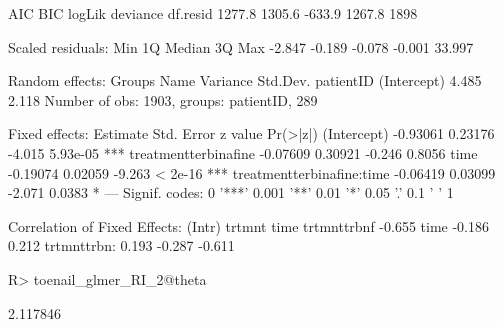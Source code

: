 \documentclass[article,nojss,shortnames]{jss}\usepackage[]{graphicx}\usepackage[]{xcolor}
\begin{document}
\begin{Schunk}
\begin{Soutput}
     AIC      BIC   logLik deviance df.resid 
  1277.8   1305.6   -633.9   1267.8     1898 

Scaled residuals: 
   Min     1Q Median     3Q    Max 
-2.847 -0.189 -0.078 -0.001 33.997 

Random effects:
 Groups    Name        Variance Std.Dev.
 patientID (Intercept) 4.485    2.118   
Number of obs: 1903, groups:  patientID, 289

Fixed effects:
                          Estimate Std. Error z value Pr(>|z|)    
(Intercept)               -0.93061    0.23176  -4.015 5.93e-05 ***
treatmentterbinafine      -0.07609    0.30921  -0.246   0.8056    
time                      -0.19074    0.02059  -9.263  < 2e-16 ***
treatmentterbinafine:time -0.06419    0.03099  -2.071   0.0383 *  
---
Signif. codes:  0 '***' 0.001 '**' 0.01 '*' 0.05 '.' 0.1 ' ' 1

Correlation of Fixed Effects:
            (Intr) trtmnt time  
trtmnttrbnf -0.655              
time        -0.186  0.212       
trtmnttrbn:  0.193 -0.287 -0.611
\end{Soutput}
\begin{Sinput}
R> toenail_glmer_RI_2@theta
\end{Sinput}
\begin{Soutput}
[1] 2.117846
\end{Soutput}
\end{Schunk}
\end{document}
